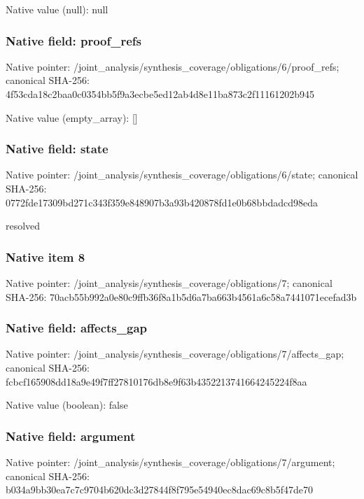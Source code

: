\documentclass[10pt,a4paper]{article}
\begin{document}
Native value (null): null

\subsubsection{Native field: proof\_\allowbreak{}refs}
Native pointer: /joint\_\allowbreak{}analysis/synthesis\_\allowbreak{}coverage/obligations/6/proof\_\allowbreak{}refs; canonical SHA-256: 4f53cda18c2baa0c0354bb5f9a3ecbe5ed12ab4d8e11ba873c2f11161202b945

Native value (empty\_\allowbreak{}array): []

\subsubsection{Native field: state}
Native pointer: /joint\_\allowbreak{}analysis/synthesis\_\allowbreak{}coverage/obligations/6/state; canonical SHA-256: 0772fde17309bd271c343f359e848907b3a93b420878fd1e0b68bbdadcd98eda

\begingroup\raggedright\sloppy resolved\par\endgroup

\subsubsection{Native item 8}
Native pointer: /joint\_\allowbreak{}analysis/synthesis\_\allowbreak{}coverage/obligations/7; canonical SHA-256: 70acb55b992a0e80c9ffb36f8a1b5d6a7ba663b4561a6c58a7441071ecefad3b

\subsubsection{Native field: affects\_\allowbreak{}gap}
Native pointer: /joint\_\allowbreak{}analysis/synthesis\_\allowbreak{}coverage/obligations/7/affects\_\allowbreak{}gap; canonical SHA-256: fcbcf165908dd18a9e49f7ff27810176db8e9f63b4352213741664245224f8aa

Native value (boolean): false

\subsubsection{Native field: argument}
Native pointer: /joint\_\allowbreak{}analysis/synthesis\_\allowbreak{}coverage/obligations/7/argument; canonical SHA-256: b034a9bb30ea7c7c9704b620dc3d27844f8f795e54940ec8dac69c8b5f47de70
\end{document}
